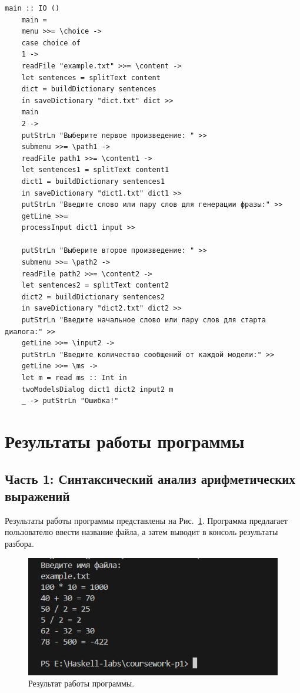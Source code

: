 \documentclass[a4paper, final]{article}
\begin{document}
\begin{lstlisting}[caption={Код функции main}, label={lst:main2}]
	main :: IO ()
	main =
	menu >>= \choice -> 
	case choice of 
	1 -> 
	readFile "example.txt" >>= \content ->
	let sentences = splitText content 
	dict = buildDictionary sentences 
	in saveDictionary "dict.txt" dict >>
	main
	2 -> 
	putStrLn "Выберите первое произведение: " >>
	submenu >>= \path1 -> 
	readFile path1 >>= \content1 -> 
	let sentences1 = splitText content1    
	dict1 = buildDictionary sentences1
	in saveDictionary "dict1.txt" dict1 >>
	putStrLn "Введите слово или пару слов для генерации фразы:" >>
	getLine >>=  
	processInput dict1 input >>
	
	putStrLn "Выберите второе произведение: " >>
	submenu >>= \path2 -> 
	readFile path2 >>= \content2 -> 
	let sentences2 = splitText content2      
	dict2 = buildDictionary sentences2
	in saveDictionary "dict2.txt" dict2 >>
	putStrLn "Введите начальное слово или пару слов для старта диалога:" >>
	getLine >>= \input2 -> 
	putStrLn "Введите количество сообщений от каждой модели:" >>
	getLine >>= \ms -> 
	let m = read ms :: Int in
	twoModelsDialog dict1 dict2 input2 m
	_ -> putStrLn "Ошибка!"
\end{lstlisting}



\newpage
\section {Результаты работы программы}
\subsection{Часть 1: Синтаксический анализ арифметических выражений}
Результаты работы программы представлены на Рис.~\ref{fig:pic1}. Программа предлагает пользователю ввести название файла, а затем выводит в консоль результаты разбора.

\begin{figure}[H]
	\centering
	\includegraphics[width=0.6 \linewidth]{img/pic1.png}
	\caption{Результат работы программы.}
	\label{fig:pic1}
\end{figure}
\end{document}

